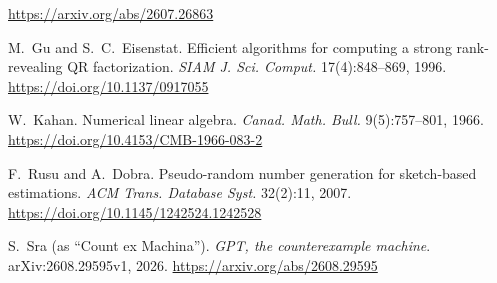 \documentclass[11pt,a4paper]{article}
\theoremstyle{definition}
\numberwithin{equation}{section}
\begin{document}
\begin{description}
\url{https://arxiv.org/abs/2607.26863}
\item[{[GE96]}] M.~Gu and S.~C.~Eisenstat. Efficient algorithms for computing a strong rank-revealing QR
factorization. \emph{SIAM J. Sci. Comput.} 17(4):848--869, 1996. \url{https://doi.org/10.1137/0917055}
\item[{[K66]}] W.~Kahan. Numerical linear algebra. \emph{Canad. Math. Bull.} 9(5):757--801, 1966.
\url{https://doi.org/10.4153/CMB-1966-083-2}
\item[{[RD07]}] F.~Rusu and A.~Dobra. Pseudo-random number generation for sketch-based estimations. \emph{ACM Trans.
Database Syst.} 32(2):11, 2007. \url{https://doi.org/10.1145/1242524.1242528}
\item[{[S26]}] S.~Sra (as ``Count ex Machina''). \emph{GPT, the counterexample machine}. arXiv:2608.29595v1, 2026.
\url{https://arxiv.org/abs/2608.29595}
\end{description}
\end{document}
